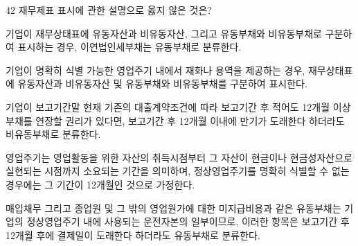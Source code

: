 \begin{question}{42}
재무제표 표시에 관한 설명으로 옳지 않은 것은?
\begin{choices}
  \item 기업이 재무상태표에 유동자산과 비유동자산, 그리고 유동부채와 비유동부채로 구분하여 표시하는 경우, 이연법인세부채는 유동부채로 분류한다.
  \item 기업이 명확히 식별 가능한 영업주기 내에서 재화나 용역을 제공하는 경우, 재무상태표에 유동자산과 비유동자산 및 유동부채와 비유동부채를 구분하여 표시한다.
  \item 기업이 보고기간말 현재 기존의 대출계약조건에 따라 보고기간 후 적어도 12개월 이상 부채를 연장할 권리가 있다면, 보고기간 후 12개월 이내에 만기가 도래한다 하더라도 비유동부채로 분류한다.
  \item 영업주기는 영업활동을 위한 자산의 취득시점부터 그 자산이 현금이나 현금성자산으로 실현되는 시점까지 소요되는 기간을 의미하며, 정상영업주기를 명확히 식별할 수 없는 경우에는 그 기간이 12개월인 것으로 가정한다.
  \item 매입채무 그리고 종업원 및 그 밖의 영업원가에 대한 미지급비용과 같은 유동부채는 기업의 정상영업주기 내에 사용되는 운전자본의 일부이므로, 이러한 항목은 보고기간 후 12개월 후에 결제일이 도래한다 하더라도 유동부채로 분류한다.
\end{choices}
\end{question}

